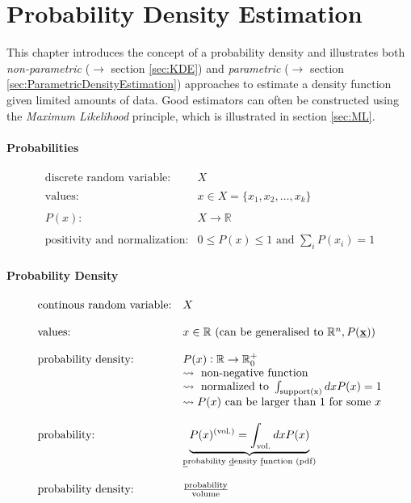 \section{Probability Density Estimation}
This chapter introduces the concept of a probability density and illustrates both \emph{non-parametric} ($\rightarrow$ section \ref{sec:KDE})  and \emph{parametric} ($\rightarrow$ section \ref{sec:ParametricDensityEstimation}) approaches to estimate a density function given limited amounts of data. Good estimators can often be constructed using the \emph{Maximum Likelihood} principle, which is illustrated in section \ref{sec:ML}.  

\paragraph{Probabilities}
\[ \begin{array}{ll}
	\text{discrete random variable:} & X \\\\
	\text{values:} & x \in X = \big\{ x_1, x_2, \ldots, x_k \big\} \\\\
	P(x): & X \rightarrow \mathbb{R} \\\\
	\text{positivity and normalization:} & 0 \leq P(x) \leq 1 
		\text{ and } \sum\limits_{i} P(x_i) = 1
\end{array} \]

\paragraph{Probability Density}
\[ \begin{array}{ll}
	\text{continous random variable:} & X \\\\
	\text{values:} & x \in \mathbb{R} \text{ (can be generalised to } \mathbb{R}^n, P(\vec{x}) \text{)} \\\\
	\text{probability density:} 
		& P(x): \mathbb{R} \rightarrow \mathbb{R}_0^+ \\
	& \leadsto \text{ non-negative function}\\
	& \leadsto \text{ normalized to }
		\int_{\mathrm{support(x)}} d x P(x) = 1\\
	& \leadsto  P(x) \text{ can be larger than } 1 \text{ for some } x \\\\
	\text{probability:} & \underbrace{ P(x)^{(\text{vol.})} 
						= \int_{\text{vol.}}dxP(x)}_{
				\text{\underline{p}robability 
					\underline{d}ensity
					\underline{f}unction (pdf)}} \\\\
	\text{probability density:} & \frac{\text{probability}}{\text{volume}}
\end{array} \] 

